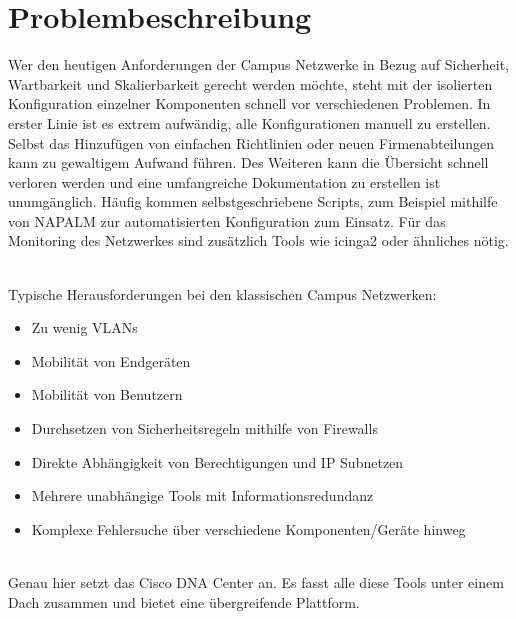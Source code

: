 \section{Problembeschreibung}
Wer den heutigen Anforderungen der Campus Netzwerke in Bezug auf Sicherheit, Wartbarkeit und Skalierbarkeit gerecht werden möchte, steht mit der isolierten Konfiguration einzelner Komponenten schnell vor verschiedenen Problemen. In erster Linie ist es extrem aufwändig, alle Konfigurationen manuell zu erstellen. Selbst das Hinzufügen von einfachen Richtlinien oder neuen Firmenabteilungen kann zu gewaltigem Aufwand führen. Des Weiteren kann die Übersicht schnell verloren werden und eine umfangreiche Dokumentation zu erstellen ist unumgänglich. Häufig kommen selbstgeschriebene Scripts, zum Beispiel mithilfe von NAPALM \cite{napalm} zur automatisierten Konfiguration zum Einsatz. Für das Monitoring des Netzwerkes sind zusätzlich Tools wie icinga2 \cite{icinga2} oder ähnliches nötig. 

~\\
Typische Herausforderungen bei den klassischen Campus Netzwerken:
\begin{itemize}
	\item Zu wenig VLANs
	\item Mobilität von Endgeräten
	\item Mobilität von Benutzern
	\item Durchsetzen von Sicherheitsregeln mithilfe von Firewalls
	\item Direkte Abhängigkeit von Berechtigungen und IP Subnetzen
	\item Mehrere unabhängige Tools mit Informationsredundanz
	\item Komplexe Fehlersuche über verschiedene Komponenten/Geräte hinweg
\end{itemize}

~\\
Genau hier setzt das Cisco DNA Center an. Es fasst alle diese Tools unter einem Dach zusammen und bietet eine übergreifende Plattform. 

